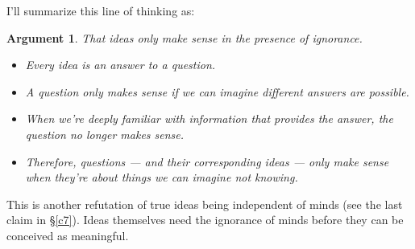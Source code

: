 \documentclass[11pt, oneside]{article}
\newtheorem*{argt}{Argument}
\begin{document}
I'll summarize this line of thinking as:
\begin{argt} That ideas only make sense in the presence of ignorance.
    \label{a3}
    \normalfont
    \begin{itemize}
        \item Every idea is an answer to a question.
        \item A question only makes sense if we can imagine different
            answers are possible.
        \item When we're deeply familiar with information that
            provides the answer, the question no longer makes sense.
        \item Therefore, questions --- and their corresponding ideas --- only
            make sense when they're about things we can imagine not knowing.
    \end{itemize}
\end{argt}
This is another refutation of true ideas being independent of minds (see
the last claim in \S\ref{c7}).
Ideas themselves need the ignorance of minds before they can be
conceived as meaningful.

\end{document}
